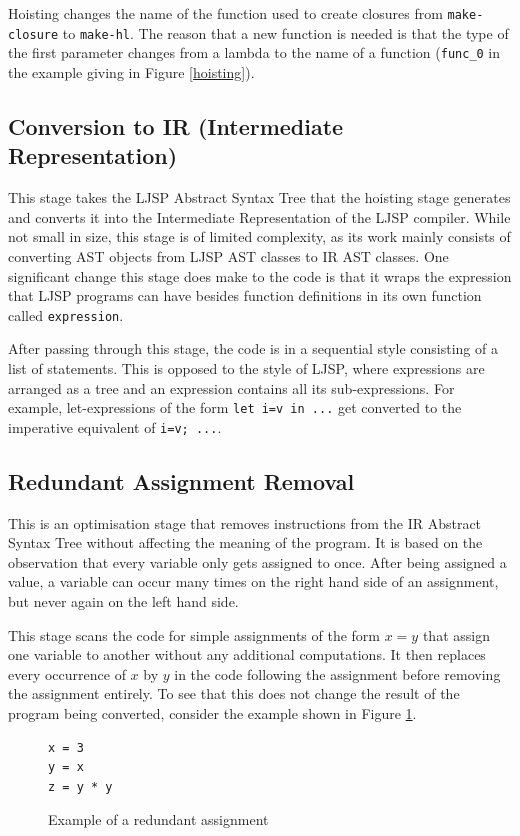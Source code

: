 \documentclass[11pt]{report}
\begin{document}
Hoisting changes the name of the function used to create closures from \texttt{make-closure} to \texttt{make-hl}. The reason that a new function is needed is that the type of the first parameter changes from a lambda to the name of a function (\texttt{func_0} in the example giving in Figure \ref{hoisting}).

\subsection{Conversion to IR (Intermediate Representation)}
This stage takes the LJSP Abstract Syntax Tree that the hoisting stage generates and converts it into the Intermediate Representation of the LJSP compiler. While not small in size, this stage is of limited complexity, as its work mainly consists of converting AST objects from LJSP AST classes to IR AST classes. One significant change this stage does make to the code is that it wraps the expression that LJSP programs can have besides function definitions in its own function called \texttt{expression}.

After passing through this stage, the code is in a sequential style consisting of a list of statements. This is opposed to the style of LJSP, where expressions are arranged as a tree and an expression contains all its sub-expressions. For example, let-expressions of the form \texttt{let i=v in ...} get converted to the imperative equivalent of \texttt{i=v; ...}.

\subsection{Redundant Assignment Removal}
This is an optimisation stage that removes instructions from the IR Abstract Syntax Tree without affecting the meaning of the program. It is based on the observation that every variable only gets assigned to once. After being assigned a value, a variable can occur many times on the right hand side of an assignment, but never again on the left hand side.

This stage scans the code for simple assignments of the form $x = y$ that assign one variable to another without any additional computations. It then replaces every occurrence of $x$ by $y$ in the code following the assignment before removing the assignment entirely. To see that this does not change the result of the program being converted, consider the example shown in Figure \ref{redrem1}.
\begin{figure}[ht]
\begin{lstlisting}
x = 3
y = x
z = y * y
\end{lstlisting}
\caption{Example of a redundant assignment}
\label{redrem1}
\end{figure}
\end{document}
